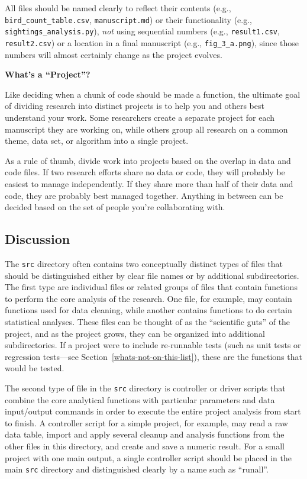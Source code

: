 \documentclass[10pt]{article}
\begin{document}
All files should be named clearly to reflect their contents (e.g.,
\texttt{bird\_count\_table.csv}, \texttt{manuscript.md}) or their
functionality (e.g., \texttt{sightings\_analysis.py}), \emph{not} using
sequential numbers (e.g., \texttt{result1.csv}, \texttt{result2.csv}) or
a location in a final manuscript (e.g., \texttt{fig\_3\_a.png}), since
those numbers will almost certainly change as the project evolves.

\begin{framed}
\noindent \textbf{What's a ``Project''?}

Like deciding when a chunk of code should be made a function, the
ultimate goal of dividing research into distinct projects is to help you
and others best understand your work. Some researchers create a separate
project for each manuscript they are working on, while others group all
research on a common theme, data set, or algorithm into a single
project.

As a rule of thumb, divide work into projects based on the overlap in
data and code files. If two research efforts share no data or code, they
will probably be easiest to manage independently. If they share more
than half of their data and code, they are probably best managed
together. Anything in between can be decided based on the set of people
you're collaborating with.
\end{framed}

\subsection*{Discussion}

The \texttt{src} directory often contains two conceptually distinct
types of files that should be distinguished either by clear file names
or by additional subdirectories. The first type are individual files
or related groups of files that contain functions to perform the core
analysis of the research. One file, for example, may contain functions
used for data cleaning, while another contains functions to do certain
statistical analyses. These files can be thought of as the
``scientific guts'' of the project, and as the project grows, they can
be organized into additional subdirectories. If a project were to
include re-runnable tests (such as unit tests or regression
tests---see Section~\ref{whats-not-on-this-list}), these are the
functions that would be tested.

The second type of file in the \texttt{src} directory is controller or
driver scripts that combine the core analytical functions with
particular parameters and data input/output commands in order to execute
the entire project analysis from start to finish. A controller script
for a simple project, for example, may read a raw data table, import and
apply several cleanup and analysis functions from the other files in
this directory, and create and save a numeric result. For a small
project with one main output, a single controller script should be
placed in the main \texttt{src} directory and distinguished clearly by a
name such as ``runall''.
\end{document}
